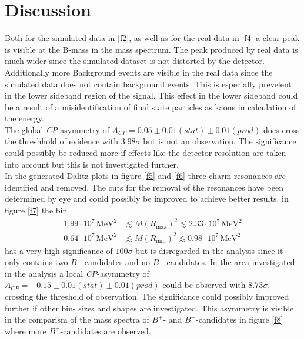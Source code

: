 \section{Discussion}
\label{sec:Diskussion}
Both for the simulated data in \autoref{f2}, as well as for the real data in \autoref{f4} a clear peak is visible at the B-mass in the
mass spectrum. The peak produced by real data is much wider since the simulated dataset is not distorted by the detector. Additionally
more Background events are visible in the real data since the simulated data does not contain background events. This is especially
prevelent in the lower sideband region of the signal. This effect in the lower sideband could be a result of a misidentification of final state
particles as kaons in calculation of the energy. \\
The global \textit{CP}-asymmetry of $A_\textit{CP} = 0.05 \pm 0.01 (stat) \pm 0.01 (prod)$ does cross the threshhold of evidence with $3.98 \sigma$
but is not an observation. The significance
could possibly be reduced more if effects like the detector resolution are taken into account but this is not investigated further. \\
In the generated Dalitz plots in figure \ref{f5} and \ref{f6} three charm resonances are identified and removed. The cuts for the
removal of the resonances have been determined by eye and could possibly be improved to achieve better results.
in figure \ref{f7} the bin
\begin{align*}
    1.99 \cdot 10^{7} \, \si{\mega\eV\squared} &\lesssim M(R_\text{max})^2 \lesssim 2.33 \cdot 10^{7} \, \si{\mega\eV\squared} \\
    0.64 \cdot 10^{7} \, \si{\mega\eV\squared} &\lesssim M(R_\text{min})^2 \lesssim 0.98 \cdot 10^{7} \, \si{\mega\eV\squared}
\end{align*}
has a very high significance of $100 \sigma$ but is disregarded in the analysis since it only contains two $B^+$-candidates and no $B^-$-candidates.
In the area investigated in the analysis a local \textit{CP}-asymmetry of $A_\textit{CP} = -0.15  \pm 0.01  (stat)  \pm 0.01(prod)$ could be observed
with $8.73 \sigma$, crossing the threshold of observation. The significance could possibly improved further if other bin- sizes and shapes are
investigated. This asymmetry is visible in the comparism of the mass spectra of $B^+$- and $B^-$-candidates in figure \ref{f8} where more
$B^+$-candidates are observed.
